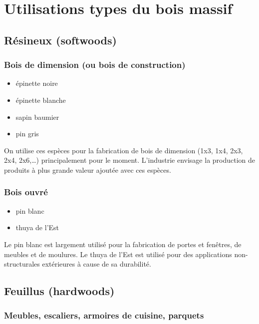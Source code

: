 \section{Utilisations types du bois massif}

\subsection{Résineux (softwoods)}

\subsubsection{Bois de dimension (ou bois de construction)}

\begin{itemize}
\item épinette noire 
\item épinette blanche
\item sapin baumier
\item pin gris
\end{itemize}

On utilise ces espèces pour la fabrication de bois de dimension (1x3, 1x4, 2x3, 2x4, 2x6,…) principalement pour le moment.  L'industrie envisage la production de produits à plus grande valeur ajoutée avec ces espèces.

\subsubsection{Bois ouvré}

\begin{itemize}
\item pin blanc
\item thuya de l'Est
\end{itemize}

Le pin blanc est largement utilisé pour la fabrication de portes et fenêtres, de meubles et de moulures. Le thuya de l'Est est utilisé pour des applications non-structurales extérieures à cause de sa durabilité.

\subsection{Feuillus (hardwoods)}

\subsubsection{Meubles, escaliers, armoires de cuisine, parquets}

